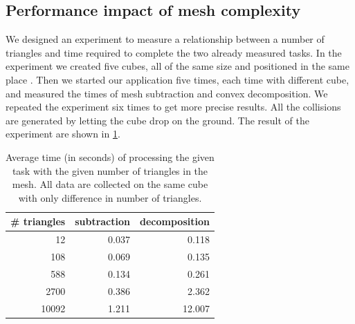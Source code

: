 \subsection{Performance impact of mesh complexity}
We designed an experiment to measure a relationship between a number of triangles and time required to complete the two already measured tasks. In the experiment we created five cubes, all of the same size and positioned in the same place . Then we started our application five times, each time with different cube, and measured the times of mesh subtraction and convex decomposition. We repeated the experiment six times to get more precise results.  All the collisions are generated by letting the cube drop on the ground. The result of the experiment are shown in \cref{tab:subtraction-decomposition}. 
\begin{table}
\centering
\begin{tabular}{r r r}
\# triangles & subtraction & decomposition \\
\hline
12 & 0.037 & 0.118 \\
108 & 0.069 & 0.135 \\
588 & 0.134 & 0.261 \\ 
2700 & 0.386 & 2.362 \\ 
10092 & 1.211 & 12.007 \\
\end{tabular}
\caption{Average time (in seconds) of processing the given task with the given number of triangles in the mesh. All data are collected on the same cube with only difference in number of triangles.}
\label{tab:subtraction-decomposition}
\end{table}

